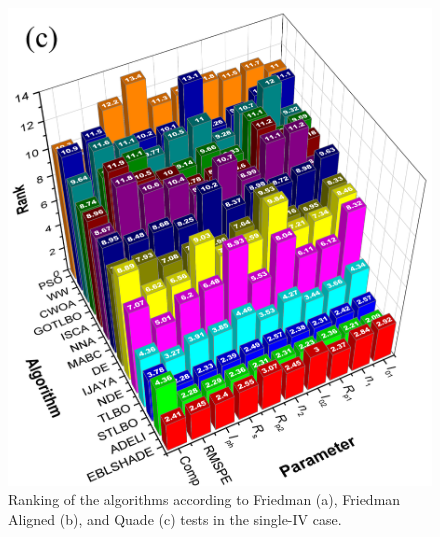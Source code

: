 \documentclass[a4paper,fleqn]{cas-dc}
\begin{document}
\begin{figure}[]
        \includegraphics[width=.77\columnwidth]{QuadeRank}
	  \caption{Ranking of the algorithms according to Friedman (a), Friedman Aligned (b), and Quade (c) tests in the single-IV case.}\label{figRanksSingleIV}
\end{figure}
\end{document}
